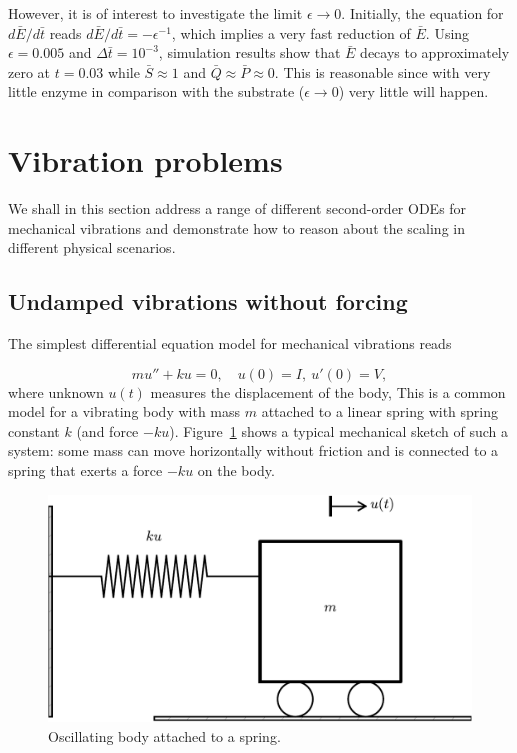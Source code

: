\documentclass[graybox,envcountchap,sectrefs,final]{svmonodo}
\begin{document}
However, it is of interest to investigate the limit $\epsilon\rightarrow 0$.
Initially, the equation for $d\bar E/d\bar t$ reads
$d\bar E/d\bar t = -\epsilon^{-1}$, which implies a very fast reduction of
$\bar E$. Using $\epsilon=0.005$ and $\Delta\bar t = 10^{-3}$, simulation
results show that $\bar E$ decays to approximately zero at $t=0.03$ while
$\bar S\approx 1$ and $\bar Q \approx \bar P\approx 0$.
This is reasonable since with
very little enzyme in comparison with the substrate ($\epsilon\rightarrow 0$)
very little will happen.

\section{Vibration problems}
\label{sec:scale:vib}

We shall in this section
address a range of different second-order ODEs for mechanical
vibrations and demonstrate how to reason about the scaling in
different physical scenarios.


\subsection{Undamped vibrations without forcing}
\label{sec:scale:vib:undamped}

The simplest differential equation model for mechanical vibrations
reads

\begin{equation}
mu'' + ku = 0,\quad u(0)=I,\ u'(0)=V,
\label{sec:scale:vib:undamped:model}
\end{equation}
where unknown $u(t)$ measures the displacement of the body,
This is a common model for a vibrating body  with mass $m$ attached
to a linear spring with spring constant $k$ (and force $-ku$).
Figure~\ref{sec:scale:vib:undamped:sketch} shows a typical mechanical
sketch of such a system: some mass can move horizontally without friction
and is connected to a spring that exerts a force $-ku$ on the body.


\begin{figure}[!ht]  %
  \centerline{\includegraphics[width=0.6\linewidth]{fig-scaling/oscillator_spring.pdf}}
  \caption{
  Oscillating body attached to a spring. \label{sec:scale:vib:undamped:sketch}
  }
\end{figure}
\end{document}
